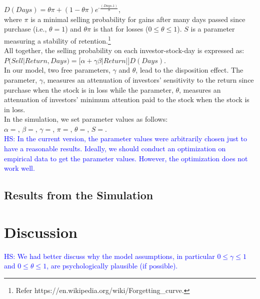\documentclass[11pt, a4paper]{article}
\newcommand{\HS}[1]{\textcolor{blue}{HS: #1}}
\begin{document}
\noindent
$D(Days)=\theta \pi + (1-\theta \pi) e^{\mbox{-}\frac{(Days\mbox{-}1)}{S}}$,\\
where $\pi$ is a minimal selling probability for gains after many days passed since purchase (i.e., $\theta=1$) and $\theta \pi$ is that for losses ($0\leq \theta \leq 1$). $S$ is a parameter measuring a stability of retention.\footnote{Refer https://en.wikipedia.org/wiki/Forgetting\_curve.}\\

All together, the selling probability on each investor-stock-day is expressed as:\\

\noindent
$P(Sell|Return, Days)=\bigg[\alpha+\gamma \beta |Return|\bigg]D(Days)$.\\

In our model, two free parameters, $\gamma$ and $\theta$, lead to the disposition effect. The parameter, $\gamma$,  measures an attenuation of investors' sensitivity to the return since purchase when the stock is in loss while the parameter, $\theta$, measures an attenuation of investors' minimum attention paid to the stock when the stock is in loss. \\

In the simulation, we set parameter values as follows:\\
$\alpha=$, $\beta=$, $\gamma=$, $\pi=$, $\theta=$, $S=$. \\
\HS{In the current version, the parameter values were arbitrarily chosen just to have a reasonable results. Ideally, we should conduct an optimization on empirical data to get the parameter values. However, the optimization does not work well.}




\subsection{Results from the Simulation}




\section{Discussion}
\HS{We had better discuss why the model assumptions, in particular $0\leq \gamma \leq 1$ and $0\leq \theta \leq 1$, are psychologically plausible (if possible).}
\end{document}
